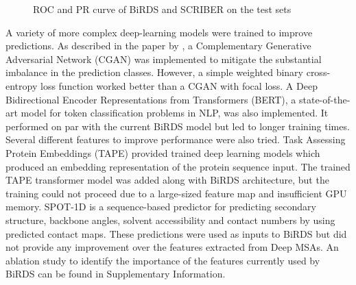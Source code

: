 \documentclass[journal=jcisd8,manuscript=article]{achemso}
\begin{document}
\begin{figure}%
    \centering
    \vspace{1em}
    \caption{\centering ROC and PR curve of BiRDS and SCRIBER on the test sets}%
    \label{fig:test_roc_prc}%
\end{figure}

\newpage
A variety of more complex deep-learning models were trained to improve predictions. As described in the paper by \citeauthor{cui2020conan}, a Complementary Generative Adversarial Network (CGAN) was implemented to mitigate the substantial imbalance in the prediction classes. However, a simple weighted binary cross-entropy loss function worked better than a CGAN with focal loss. A Deep Bidirectional Encoder Representations from Transformers (BERT)\cite{devlin2018bert}, a state-of-the-art model for token classification problems in NLP, was also implemented. It performed on par with the current BiRDS model but led to longer training times. Several different features to improve performance were also tried. Task Assessing Protein Embeddings (TAPE)\cite{rao2019evaluating} provided trained deep learning models which produced an embedding representation of the protein sequence input. The trained TAPE transformer model was added along with BiRDS architecture, but the training could not proceed due to a large-sized feature map and insufficient GPU memory. SPOT-1D\cite{hanson2019improving} is a sequence-based predictor for predicting secondary structure, backbone angles, solvent accessibility and contact numbers by using predicted contact maps. These predictions were used as inputs to BiRDS but did not provide any improvement over the features extracted from Deep MSAs. An ablation study to identify the importance of the features currently used by BiRDS can be found in Supplementary Information.
\end{document}
